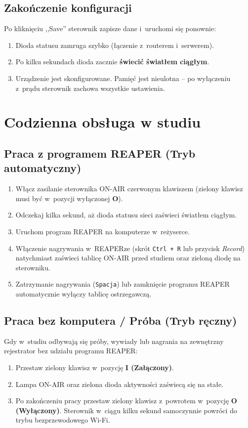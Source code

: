 \documentclass[11pt,a4paper]{article}
\providecommand{\uv}[1]{,,#1''}
\begin{document}
\subsection{Zakończenie konfiguracji}
Po kliknięciu \uv{Save} sterownik zapisze dane i~uruchomi się ponownie:
\begin{enumerate}[leftmargin=1.5em]
    \item Dioda statusu zamruga szybko (łączenie z~routerem i~serwerem).
    \item Po kilku sekundach dioda zacznie \textbf{świecić światłem ciągłym}.
    \item Urządzenie jest skonfigurowane. Pamięć jest nieulotna -- po wyłączeniu z~prądu sterownik zachowa wszystkie ustawienia.
\end{enumerate}

\newpage

\section{Codzienna obsługa w studiu}

\subsection{Praca z programem REAPER (Tryb automatyczny)}
\begin{enumerate}[leftmargin=1.5em]
    \item Włącz zasilanie sterownika ON-AIR czerwonym klawiszem (zielony klawisz musi być w~pozycji wyłączonej \textbf{O}).
    \item Odczekaj kilka sekund, aż dioda statusu sieci zaświeci światłem ciągłym.
    \item Uruchom program REAPER na komputerze w~reżyserce.
    \item Włączenie nagrywania w~REAPERze (skrót \texttt{Ctrl + R} lub przycisk \textit{Record}) natychmiast zaświeci tablicę ON-AIR przed studiem oraz zieloną diodę na sterowniku.
    \item Zatrzymanie nagrywania (\texttt{Spacja}) lub zamknięcie programu REAPER automatycznie wyłączy tablicę ostrzegawczą.
\end{enumerate}

\subsection{Praca bez komputera / Próba (Tryb ręczny)}
Gdy w~studiu odbywają się próby, wywiady lub nagrania na zewnętrzny rejestrator bez udziału programu REAPER:
\begin{enumerate}[leftmargin=1.5em]
    \item Przestaw zielony klawisz w~pozycję \textbf{I (Załączony)}.
    \item Lampa ON-AIR oraz zielona dioda aktywności zaświecą się na stałe.
    \item Po zakończeniu pracy przestaw zielony klawisz z~powrotem w~pozycję \textbf{O (Wyłączony)}. Sterownik w~ciągu kilku sekund samoczynnie powróci do trybu bezprzewodowego Wi-Fi.
\end{enumerate}
\end{document}
